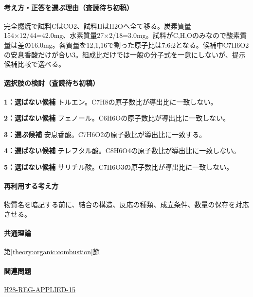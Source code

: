 \paragraph{考え方・正答を選ぶ理由（査読待ち初稿）} 完全燃焼で試料CはCO2、試料HはH2Oへ全て移る。炭素質量154×12/44=\allowbreak{}42.0mg、水素質量27×2/18=\allowbreak{}3.0mg。試料がC,H,Oのみなので酸素質量は差の16.0mg。各質量を12,1,16で割った原子比は7:6:2となる。候補中C7H6O2の安息香酸だけが合い3。組成比だけでは一般の分子式を一意にしないが、提示候補比較で選べる。

\paragraph{選択肢の検討（査読待ち初稿）}\mbox{}\par

\noindent\textbf{1：選ばない候補} トルエン。C7H8の原子数比が導出比に一致しない。\par

\noindent\textbf{2：選ばない候補} フェノール。C6H6Oの原子数比が導出比に一致しない。\par

\noindent\textbf{3：選ぶ候補} 安息香酸。C7H6O2の原子数比が導出比に一致する。\par

\noindent\textbf{4：選ばない候補} テレフタル酸。C8H6O4の原子数比が導出比に一致しない。\par

\noindent\textbf{5：選ばない候補} サリチル酸。C7H6O3の原子数比が導出比に一致しない。\par

\paragraph{再利用する考え方} 物質名を暗記する前に、結合の構造、反応の種類、成立条件、数量の保存を対応させる。

\paragraph{共通理論} \hyperref[theory:organic:combustion]{第\ref*{theory:organic:combustion}節}

\paragraph{関連問題} \hyperref[q:h28-reg-applied-15]{H28-REG-APPLIED-15}

